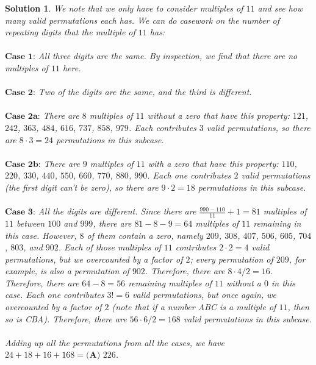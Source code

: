 \documentclass[12pt]{article}
\newtheorem*{solution*}{Solution}
\begin{document}
\begin{solution*}
    We note that we only have to consider multiples of $11$ and see how many valid permutations each has. We can do casework on the number of repeating digits that the multiple of $11$ has:
\\ \\
$\textbf{Case 1:}$ All three digits are the same. 
By inspection, we find that there are no multiples of $11$ here.
\\ \\
$\textbf{Case 2:}$ Two of the digits are the same, and the third is different.
\\ \\
$\textbf{Case 2a:}$
There are $8$ multiples of $11$ without a zero that have this property:
$121$, $242$, $363$, $484$, $616$, $737$, $858$, $979$.
Each contributes $3$ valid permutations, so there are $8 \cdot 3 = 24$ permutations in this subcase.
\\ \\
$\textbf{Case 2b:}$
There are $9$ multiples of $11$ with a zero that have this property:
$110$, $220$, $330$, $440$, $550$, $660$, $770$, $880$, $990$.
Each one contributes $2$ valid permutations (the first digit can't be zero), so there are $9 \cdot 2 = 18$ permutations in this subcase.
\\ \\
$\textbf{Case 3:}$ All the digits are different.
Since there are $\frac{990-110}{11}+1 = 81$ multiples of $11$ between $100$ and $999$, there are $81-8-9 = 64$ multiples of $11$ remaining in this case. However, $8$ of them contain a zero, namely $209$, $308$, $407$, $506$, $605$, $704$, $803$, and $902$. Each of those multiples of $11$ contributes $2 \cdot 2=4$ valid permutations, but we overcounted by a factor of $2$; every permutation of $209$, for example, is also a permutation of $902$. Therefore, there are $8 \cdot 4 / 2 = 16$. Therefore, there are $64-8=56$ remaining multiples of $11$ without a $0$ in this case. Each one contributes $3! = 6$ valid permutations, but once again, we overcounted by a factor of $2$ (note that if a number ABC is a multiple of $11$, then so is CBA). Therefore, there are $56 \cdot 6 / 2 = 168$ valid permutations in this subcase.
\\ \\
Adding up all the permutations from all the cases, we have $24+18+16+168 = \boxed{\textbf{(A) } 226}$.
\\ 
\end{solution*}
\end{document}
